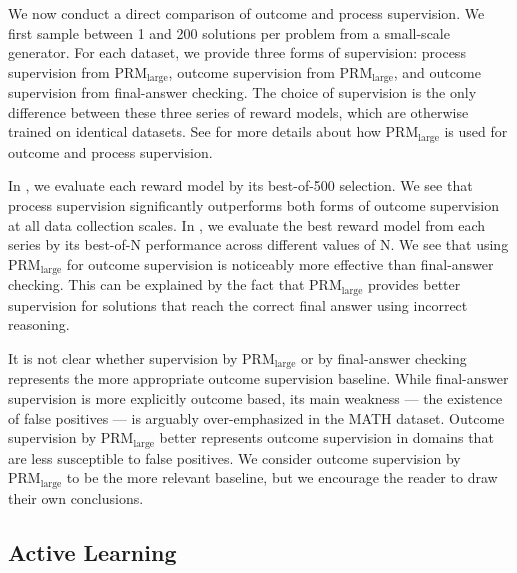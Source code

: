 \documentclass{article}
\begin{document}
We now conduct a direct comparison of outcome and process supervision. We first sample between 1 and 200 solutions per problem from a small-scale generator. For each dataset, we provide three forms of supervision: process supervision from $\text{PRM}_{\text{large}}$, outcome supervision from $\text{PRM}_{\text{large}}$, and outcome supervision from final-answer checking. The choice of supervision is the only difference between these three series of reward models, which are otherwise trained on identical datasets. See  for more details about how $\text{PRM}_{\text{large}}$ is used for outcome and process supervision.

In , we evaluate each reward model by its best-of-500 selection. We see that process supervision significantly outperforms both forms of outcome supervision at all data collection scales. In , we evaluate the best reward model from each series by its best-of-N performance across different values of N. We see that using $\text{PRM}_{\text{large}}$ for outcome supervision is noticeably more effective than final-answer checking. This can be explained by the fact that $\text{PRM}_{\text{large}}$ provides better supervision for solutions that reach the correct final answer using incorrect reasoning.

It is not clear whether supervision by $\text{PRM}_{\text{large}}$ or by final-answer checking represents the more appropriate outcome supervision baseline. While final-answer supervision is more explicitly outcome based, its main weakness --- the existence of false positives --- is arguably over-emphasized in the MATH dataset. Outcome supervision by $\text{PRM}_{\text{large}}$ better represents outcome supervision in domains that are less susceptible to false positives. We consider outcome supervision by $\text{PRM}_{\text{large}}$ to be the more relevant baseline, but we encourage the reader to draw their own conclusions.

\subsection{Active Learning} \label{section:active_learning}
\end{document}
